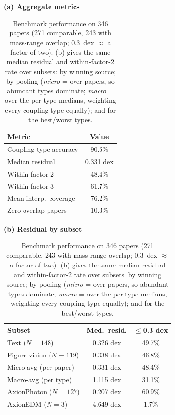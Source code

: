 \documentclass{article}
\begin{document}
\begin{table}[t]
\caption{Benchmark performance on 346 papers (271 comparable, 243 with mass-range overlap; $0.3$~dex $\approx$ a factor of two). (b) gives the same median residual and within-factor-2 rate over subsets: by winning source; by pooling (\emph{micro} = over papers, so abundant types dominate; \emph{macro} = over the per-type medians, weighting every coupling type equally); and for the best/worst types.}
\label{tab:results}
\centering
\small
\begin{minipage}[t]{0.40\linewidth}
\centering
\textbf{(a) Aggregate metrics}\\[3pt]
\begin{tabular}{@{}lc@{}}
\toprule
\textbf{Metric} & \textbf{Value} \\
\midrule
Coupling-type accuracy & 90.5\% \\
Median residual        & 0.331 dex \\
Within factor 2        & 48.4\% \\
Within factor 3        & 61.7\% \\
Mean interp.\ coverage & 76.2\% \\
Zero-overlap papers    & 10.3\% \\
\bottomrule
\end{tabular}
\end{minipage}\hfill
\begin{minipage}[t]{0.57\linewidth}
\centering
\textbf{(b) Residual by subset}\\[3pt]
\begin{tabular}{@{}lcc@{}}
\toprule
\textbf{Subset} & \textbf{Med.\ resid.} & \textbf{$\leq$0.3 dex} \\
\midrule
Text ($N{=}148$)          & 0.326 dex & 49.7\% \\
Figure-vision ($N{=}119$) & 0.338 dex & 46.8\% \\
\addlinespace
Micro-avg (per paper)     & 0.331 dex & 48.4\% \\
Macro-avg (per type)      & 1.115 dex & 31.1\% \\
\addlinespace
AxionPhoton ($N{=}127$)   & 0.207 dex & 60.9\% \\
AxionEDM ($N{=}3$)        & 4.649 dex & 1.7\% \\
\bottomrule
\end{tabular}
\end{minipage}
\end{table}
\end{document}
